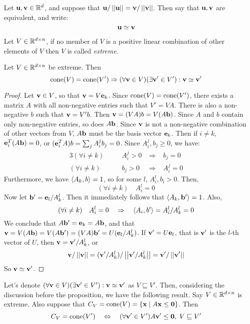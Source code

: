 \begin{Def}
	Let $\mathbf{u},\mathbf{v} \in \mathbb{R}^d$, and suppose that $\mathbf{u}/\left|\left|\mathbf{u}\right|\right| = \mathbf{v}/\left|\left|\mathbf{v}\right|\right|$.  Then say that $\mathbf{u},\mathbf{v}$ are equivalent, and write:
	\[ \mathbf{u} \simeq \mathbf{v} \]
\end{Def}

\begin{Def}[Extreme]
	Let $V \in \mathbb{R}^{d\times n}$, if no member of $V$ is a positive linear combination of other elements of $V$ then $V$ is called \textit{extreme}.
\end{Def}


\begin{Prop}{\label{prop:minrays}
		Let $V \in \mathbb{R}^{d\times n}$ be extreme.  Then
		\[ \operatorname{cone}(V) = \operatorname{cone}(V') \Rightarrow (\forall \mathbf{v} \in V)(\exists \mathbf{v}'\in V')
			: \mathbf{v} \simeq \mathbf{v}' \]
	} \end{Prop}

\begin{proof}
	Let $\mathbf{v} \in V$, so that $\mathbf{v} = V\mathbf{e}_k$.  Since $\operatorname{cone}(V) = \operatorname{cone}(V')$, there exists a matrix $A$ with all non-negative entries such that $V' = VA$.  There is also a non-negative $b$ such that $\mathbf{v} = V'b$.  Then $\mathbf{v} = (VA)b = V(A\mathbf{b})$.  Since $A$ and $b$ contain only non-negative entries, so does $A\mathbf{b}$.  Since $\mathbf{v}$ is not a non-negative combination of other vectors from $V$, $A\mathbf{b}$ must be the basis vector $\mathbf{e}_k$.  Then if $i \neq k$, $\mathbf{e}_i^T(A\mathbf{b}) = 0$, or $(\mathbf{e}_i^TA)b = \sum_j A_i^j b_j = 0$.  Since $A_i^j, b_j \geq 0$, we have:
	\begin{alignat*}{3}
		(\forall i \neq k) & \quad & A_i^j > 0 \; & \Rightarrow & \; b_j = 0   \\
		(\forall i \neq k) & \quad & b_j > 0   \; & \Rightarrow & \; A_i^j = 0
	\end{alignat*}
	Furthermore, we have $\left\langle A_k, b \right\rangle = 1$, so for some $l$, $A_i^l,b_l > 0$.  Then,
	\[ (\forall i \neq k)\quad A_i^l = 0 \]
	Now let $\mathbf{b}'=\mathbf{e}_l/A_k^l$.  Then it immediately follows that $\left\langle A_k, \mathbf{b}' \right\rangle = 1$.  Also,
	\[ (\forall i \neq k)\quad A_i^l = 0 \quad \Rightarrow\quad \left\langle A_i, b' \right\rangle = A_i^l/A_k^l = 0\]
	We conclude that $A\mathbf{b}' = \mathbf{e}_k = A\mathbf{b}$, and that $\mathbf{v} = V(A\mathbf{b}) = V(A\mathbf{b}') = (VA)\mathbf{b}' = U(\mathbf{e}_l/A_k^l)$.  If $\mathbf{v}' = U\mathbf{e}_l$, that is $\mathbf{v}'$ is the $l$-th vector of $U$, then $\mathbf{v} = \mathbf{v}'/A_k^l$, or
	\[ \mathbf{v}/\left|\left|\mathbf{v}\right|\right| = (\mathbf{v}'/A_k^l)/\left|\left|\mathbf{v}'/A_k^l\right|\right| = \mathbf{v}'/\left|\left|\mathbf{v}'\right|\right| \]
	So $\mathbf{v} \simeq \mathbf{v}'$.
\end{proof}

Let's denote $(\forall \mathbf{v} \in V)(\exists \mathbf{v}'\in V') : \mathbf{v} \simeq \mathbf{v}'$ as $V \sqsubseteq V'$.  Then, considering the discussion before the proposition, we have the following result.  Say $V \in \mathbb{R}^{d\times n}$ is extreme.  Also suppose that $C_V = \operatorname{cone}(V) = \left\{\mathbf{x}\;|\; A\mathbf{x}\leq\mathbf{0}\right\}$.  Then
\[ C_V = \operatorname{cone}(V') \quad\Leftrightarrow\quad
	(\forall \mathbf{v}'\in V')A\mathbf{v}'\leq\mathbf{0},\; V \sqsubseteq V' \]

